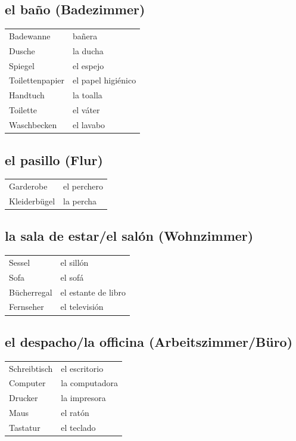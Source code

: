\documentclass{spanish_summary}
\begin{document}
\subsection*{el ba\~{n}o (Badezimmer)}
\begin{longtable}{p{} p{}} 
  Badewanne & ba\~{n}era \\
  Dusche & la ducha \\
  Spiegel & el espejo \\
  Toilettenpapier & el papel higiénico\\
  Handtuch & la toalla \\
  Toilette & el váter \\
  Waschbecken & el lavabo\\
\end{longtable}

\subsection*{el pasillo (Flur)}
\begin{longtable}{p{} p{}} 
  Garderobe & el perchero \\
  Kleiderbügel & la percha \\
\end{longtable}

\subsection*{la sala de estar/el salón (Wohnzimmer)}
\begin{longtable}{p{} p{}} 
  Sessel & el sillón \\
  Sofa & el sofá \\
  Bücherregal & el estante de libro \\
  Fernseher & el televisión \\
\end{longtable}

\subsection*{el despacho/la officina (Arbeitszimmer/Büro)}
\begin{longtable}{p{} p{}} 
  Schreibtisch & el escritorio \\
  Computer & la computadora \\
  Drucker & la impresora \\
  Maus & el ratón \\
  Tastatur & el teclado \\
\end{longtable}
\end{document}
